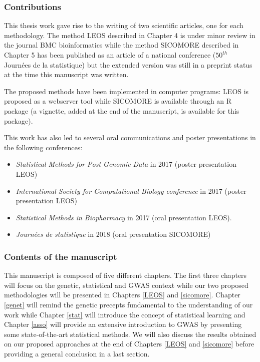 \documentclass[]{book}
\begin{document}
\hypertarget{contributions}{%
\subsubsection*{Contributions}\label{contributions}}

This thesis work gave rise to the writing of two scientific articles,
one for each methodology. The method LEOS described in Chapter 4 is
under minor review in the journal BMC bioinformatics while the method
SICOMORE described in Chapter 5 has been published as an article of a
national conference (\(50^{th}\) Journées de la statistique) but the
extended version was still in a preprint status at the time this
manuscript was written.

The proposed methods have been implemented in computer programs: LEOS is
proposed as a webserver tool while SICOMORE is available through an R
package (a vignette, added at the end of the manuscript, is available
for this package).

This work has also led to several oral communications and poster
presentations in the following conferences:

\begin{itemize}
\item
  \emph{Statistical Methods for Post Genomic Data} in 2017 (poster
  presentation LEOS)
\item
  \emph{International Society for Computational Biology conference} in 2017
  (poster presentation LEOS)
\item
  \emph{Statistical Methods in Biopharmacy} in 2017 (oral presentation
  LEOS).
\item
  \emph{Journées de statistique} in 2018 (oral presentation SICOMORE)
\end{itemize}

\hypertarget{contents-of-the-manuscript}{%
\subsubsection*{Contents of the manuscript}\label{contents-of-the-manuscript}}

This manuscript is composed of five different chapters. The first three
chapters will focus on the genetic, statistical and GWAS context while
our two proposed methodologies will be presented in Chapters \ref{LEOS} and \ref{sicomore}.
Chapter \ref{genet} will remind the genetic precepts fundamental to the
understanding of our work while Chapter \ref{stat} will introduce the concept of
statistical learning and Chapter \ref{asso} will provide an extensive
introduction to GWAS by presenting some state-of-the-art statistical
methods. We will also discuss the results obtained on our proposed
approaches at the end of Chapters \ref{LEOS} and \ref{sicomore} before providing a general
conclusion in a last section.
\end{document}
